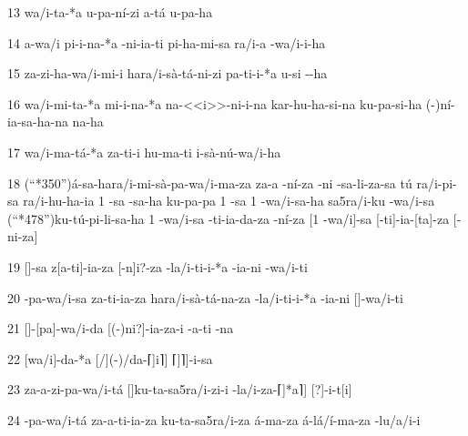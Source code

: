 13 wa/i-ta-*a u-pa-ní-zi a-tá \lmasc{}\lbreak{}u-pa-ha

14 a-wa/i pi-i-na-*a \lmasc{}-ni-ia-ti pi-ha-mi-sa ra/i-a \lmasc{}-wa/i-i-ha

15 \lmasc{}za-zi-ha-wa/i-mi-i ha\logo{+}ra/i-sà-tá-ni-zi pa-ti-i-*a u-si \lmasc{}--ha

16 wa/i-mi-ta-*a mi-i-na-*a na-<<i>>-ni-i-na kar-hu-ha-si-na ku-pa-si-ha (-)ní-ia-sa-ha-na \lmasc{}na-ha

17 wa/i-ma-tá-*a \lmasc{}za\lbreak{}-ti-i \lmasc{}hu-ma-ti \lmasc{}i-sà-nú-wa/i-ha

18 (“*350”)á-sa-ha\logo{+}ra/i-mi-sà-pa-wa/i-ma-za \lmasc{}za-a -ní-za \lmasc{}-ni -sa-li-za-sa \lmasc{}tú\logo{+} ra/i-pi-sa \logo{+}ra/i-hu-ha-ia 1 -sa -sa-ha ku-pa-pa 1 -sa 1 -wa/i-sa-ha sa5\logo{+}ra/i-ku -wa/i-sa (“*478”)ku-tú-pi-li-sa-ha 1 -wa/i-sa \lmasc{}-ti-ia-da-za -ní-za \lbreak{} $[$1 -wa/i$]$-sa [-ti]-ia-[ta]-za [-ni-za]

19 $[$$]$-sa z[a-ti]-ia-za [-n]i?-za -la/i-ti-i-*a \lbreak{} -ia-ni \lmasc{}-wa/i-ti

20 \lmasc{}-pa-wa/i-sa \lmasc{}za-ti-ia-za  ha\logo{+}ra/i-sà-tá-na-za -la/i-ti-i-*a \lmasc{}-ia-ni $[$$]$-wa/i-ti

21 $[$\lmasc{}$]$-[pa]-wa/i-da [(-)ni?]-ia-za-i -a-ti -na

22 $[$wa/i$]$-da-*a [/](-)/da-\textsc{⌈]}i\textsc{⌉]} \textsc{⌈]}\lmasc{}\textsc{⌉]}-i-sa

23 \lmasc{}za-a-zi-pa-wa/i-tá $[$$]$ku-ta-sa5\logo{+}ra/i-zi-i -la/i-za-\textsc{⌈]}*a\textsc{⌉]} [?]\lbreak{}-i-t[i]

24 \lmasc{}-pa-wa/i-tá \lmasc{}za-a-ti-ia-za \lmasc{} ku-ta-sa5\logo{+}ra/i-za \lmasc{}á-ma-za \lmasc{}á-lá/í-ma-za \lmasc{} \lmasc{}-lu/a/i-i

